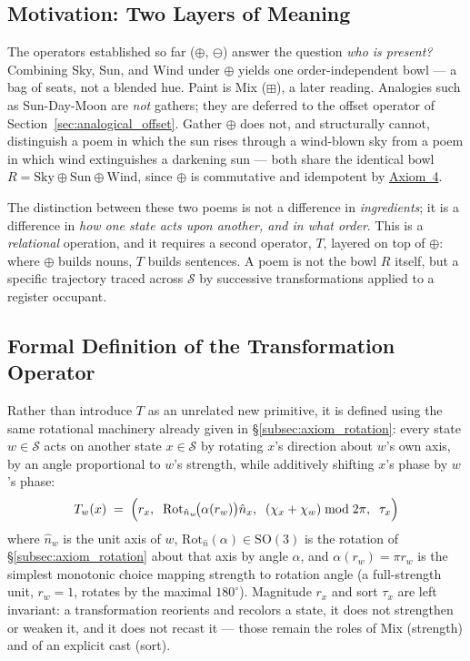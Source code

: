 \documentclass[12pt, a4paper]{article}
\begin{document}
\subsection{Motivation: Two Layers of Meaning}
\label{subsec:transform_motivation}
The operators established so far ($\oplus$, $\ominus$) answer the question
\emph{who is present?} Combining Sky, Sun, and Wind under $\oplus$
yields one order-independent bowl --- a bag of seats, not a blended
hue. Paint is Mix ($\boxplus$), a later reading. Analogies such as Sun-Day-Moon are \emph{not} gathers; they are deferred to the offset operator of Section~\ref{sec:analogical_offset}. Gather $\oplus$ does not, and structurally
cannot, distinguish a poem in which the sun rises through a wind-blown
sky from a poem in which wind extinguishes a darkening sun --- both
share the identical bowl
$R = \text{Sky} \oplus \text{Sun} \oplus \text{Wind}$, since $\oplus$
is commutative and idempotent by \hyperref[subsec:axiom_idempotence]{Axiom~4}.

The distinction between these two poems is not a difference in
\emph{ingredients}; it is a difference in \emph{how one state acts
upon another, and in what order}. This is a \emph{relational}
operation, and it requires a second operator, $T$, layered on top of
$\oplus$: where $\oplus$ builds nouns, $T$ builds sentences. A poem is
not the bowl $R$ itself, but a specific trajectory traced across
$\mathcal{S}$ by successive transformations applied to a register occupant.

\subsection{Formal Definition of the Transformation Operator}
\label{subsec:transform_definition}
Rather than introduce $T$ as an unrelated new primitive, it is defined
using the same rotational machinery already given in
\S\ref{subsec:axiom_rotation}: every state $w \in \mathcal{S}$
acts on another state $x \in \mathcal{S}$ by rotating $x$'s direction
about $w$'s own axis, by an angle proportional to $w$'s strength, while
additively shifting $x$'s phase by $w$'s phase:
\begin{equation}
    T_w(x)
    \;=\;
    \Bigl(
        r_x,\;\;
        \mathrm{Rot}_{\hat n_w}\!\bigl(\alpha(r_w)\bigr)\hat n_x,\;\;
        (\chi_x + \chi_w) \bmod 2\pi,\;\;
        \tau_x
    \Bigr)
    \label{eq:transform_def}
\end{equation}
where $\hat n_w$ is the unit axis of $w$,
$\mathrm{Rot}_{\hat n}(\alpha) \in \mathrm{SO}(3)$ is the
rotation of \S\ref{subsec:axiom_rotation} about that axis by angle
$\alpha$, and $\alpha(r_w) = \pi r_w$ is the simplest monotonic choice
mapping strength to rotation angle (a full-strength unit, $r_w = 1$,
rotates by the maximal $180^\circ$). Magnitude $r_x$ and sort $\tau_x$ are left invariant:
a transformation reorients and recolors a state, it does not
strengthen or weaken it, and it does not recast it --- those remain
the roles of Mix (strength) and of an explicit cast (sort).
\end{document}
